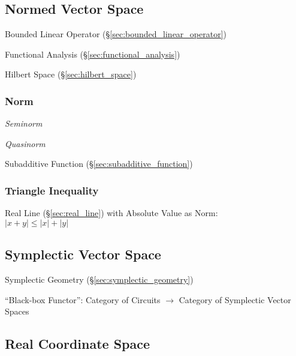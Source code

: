 \subsection{Normed Vector Space}\label{sec:normed_vectorspace}

Bounded Linear Operator (\S\ref{sec:bounded_linear_operator})

Functional Analysis (\S\ref{sec:functional_analysis})

Hilbert Space (\S\ref{sec:hilbert_space})



\subsubsection{Norm}\label{sec:norm}

\emph{Seminorm}

\emph{Quasinorm}

Subadditive Function (\S\ref{sec:subadditive_function})



\subsubsection{Triangle Inequality}\label{sec:triangle_inequality}

Real Line (\S\ref{sec:real_line}) with Absolute Value as Norm:\\
$|x + y| \leq |x| + |y|$



\subsection{Symplectic Vector Space}\label{sec:symplectic_vectorspace}

Symplectic Geometry (\S\ref{sec:symplectic_geometry})

``Black-box Functor'': Category of Circuits $\rightarrow$ Category of
Symplectic Vector Spaces %



\subsection{Real Coordinate Space}\label{sec:real_space}

